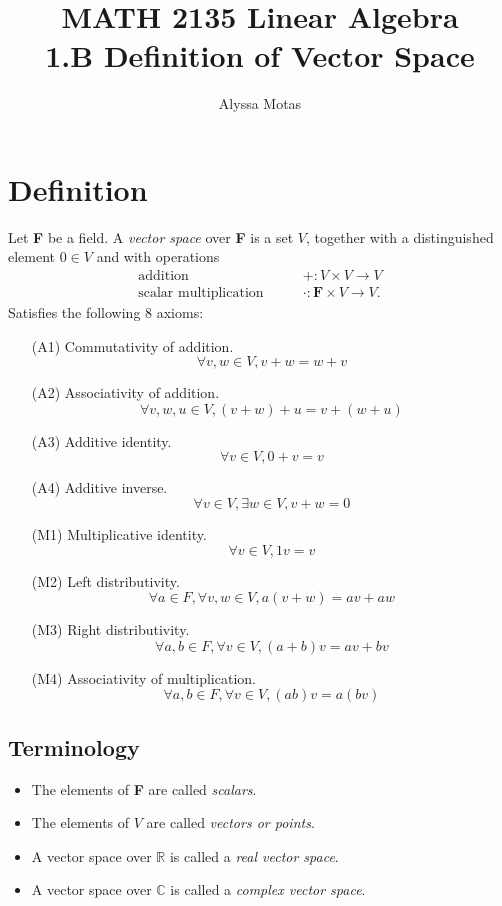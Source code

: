 \documentclass[11pt]{article}
\title{\textbf{MATH 2135 Linear Algebra} \\ 1.B Definition of Vector Space}
\author{Alyssa Motas}
\begin{document}
    \maketitle

    \pagebreak

    \tableofcontents

    \pagebreak

    \section{Definition}

    Let \textbf{F} be a field. A \emph{vector space} over \textbf{F} is a set $V$, together with a distinguished element \(0 \in V\) and with operations 
    \begin{align*}
        \text{addition} \qquad              & + : V \times V \rightarrow V \\
        \text{scalar multiplication} \qquad & \cdot : \textbf{F} \times V \rightarrow V.
    \end{align*}
    Satisfies the following 8 axioms:
    \begin{enumerate}
        \item[(A1)] Commutativity of addition. \[\forall v,w \in V, v + w = w + v\] 
        \item[(A2)] Associativity of addition. \[\forall v,w,u \in V, (v+w)+u = v+(w+u)\]
        \item[(A3)] Additive identity. \[\forall v \in V, 0 + v = v\]
        \item[(A4)] Additive inverse. \[\forall v \in V, \exists w \in V, v + w = 0\]
        \item[(M1)] Multiplicative identity. \[\forall v \in V, 1v = v\]
        \item[(M2)] Left distributivity. \[\forall a \in F, \forall v,w \in V, a(v+w) = av + aw\]
        \item[(M3)] Right distributivity. \[\forall a,b \in F, \forall v \in V, (a+b)v = av + bv\]
        \item[(M4)] Associativity of multiplication. \[\forall a,b \in F, \forall v \in V, (ab)v = a(bv)\]    
    \end{enumerate}

    \subsection{Terminology}

    \begin{itemize}
        \item The elements of \textbf{F} are called \emph{scalars}.
        \item The elements of $V$ are called \emph{vectors or points}.
        \item A vector space over \(\mathbb{R}\) is called a \emph{real vector space}.
        \item A vector space over \(\mathbb{C}\) is called a \emph{complex vector space}.
    \end{itemize}
\end{document}
